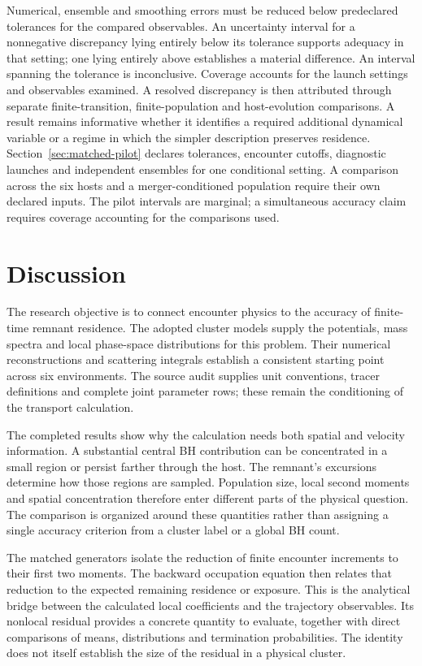 \documentclass[aps,prd,reprint,amsmath,amssymb,superscriptaddress,nofootinbib,longbibliography,floatfix]{revtex4-2}
\begin{document}
Numerical, ensemble and smoothing errors must be reduced below predeclared tolerances for the compared observables. An uncertainty interval for a nonnegative discrepancy lying entirely below its tolerance supports adequacy in that setting; one lying entirely above establishes a material difference. An interval spanning the tolerance is inconclusive. Coverage accounts for the launch settings and observables examined. A resolved discrepancy is then attributed through separate finite-transition, finite-population and host-evolution comparisons. A result remains informative whether it identifies a required additional dynamical variable or a regime in which the simpler description preserves residence. Section~\ref{sec:matched-pilot} declares tolerances, encounter cutoffs, diagnostic launches and independent ensembles for one conditional setting. A comparison across the six hosts and a merger-conditioned population require their own declared inputs. The pilot intervals are marginal; a simultaneous accuracy claim requires coverage accounting for the comparisons used.

\section{Discussion}\label{sec:discussion}

The research objective is to connect encounter physics to the accuracy of finite-time remnant residence. The adopted cluster models supply the potentials, mass spectra and local phase-space distributions for this problem. Their numerical reconstructions and scattering integrals establish a consistent starting point across six environments. The source audit supplies unit conventions, tracer definitions and complete joint parameter rows; these remain the conditioning of the transport calculation.

The completed results show why the calculation needs both spatial and velocity information. A substantial central BH contribution can be concentrated in a small region or persist farther through the host. The remnant's excursions determine how those regions are sampled. Population size, local second moments and spatial concentration therefore enter different parts of the physical question. The comparison is organized around these quantities rather than assigning a single accuracy criterion from a cluster label or a global BH count.

The matched generators isolate the reduction of finite encounter increments to their first two moments. The backward occupation equation then relates that reduction to the expected remaining residence or exposure. This is the analytical bridge between the calculated local coefficients and the trajectory observables. Its nonlocal residual provides a concrete quantity to evaluate, together with direct comparisons of means, distributions and termination probabilities. The identity does not itself establish the size of the residual in a physical cluster.
\end{document}
